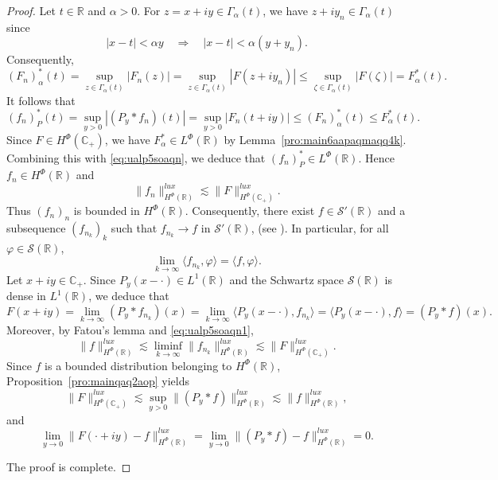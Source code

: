 \documentclass[a4paper,12pt,intlimits,oneside]{amsart}
\theoremstyle{definition}
\numberwithin{equation}{section}
\theoremstyle{definition}
\begin{document}
\begin{proof}
Let $t\in\mathbb{R}$ and $\alpha>0$. 
For $z=x+iy\in\Gamma_{\alpha}(t)$, we have $z+i y_{n}\in\Gamma_{\alpha}(t)$ since
\[
|x-t|<\alpha y
\quad\Rightarrow\quad
|x-t|<\alpha(y+y_{n}).
\]
Consequently,
\[
(F_{n})_{\alpha}^{*}(t)
=\sup_{z\in\Gamma_{\alpha}(t)}|F_{n}(z)|
=\sup_{z\in\Gamma_{\alpha}(t)}|F(z+i y_{n})|
\le 
\sup_{\zeta\in\Gamma_{\alpha}(t)}|F(\zeta)|
=F_{\alpha}^{*}(t).
\]
It follows that
\begin{equation}\label{eq:ualp5soaqn}
(f_{n})_{P}^{*}(t)
=\sup_{y>0}|(P_{y}\ast f_{n})(t)|
=\sup_{y>0}|F_{n}(t+iy)|
\le 
(F_{n})_{\alpha}^{*}(t)
\le 
F_{\alpha}^{*}(t).
\end{equation}
Since $F\in H^{\Phi}(\mathbb{C}_{+})$, we have $F_{\alpha}^{*}\in L^{\Phi}(\mathbb{R})$ by Lemma~\ref{pro:main6aapaqmaqq4k}. 
Combining this with \eqref{eq:ualp5soaqn}, we deduce that $(f_{n})_{P}^{*}\in L^{\Phi}(\mathbb{R})$. 
Hence $f_{n}\in H^{\Phi}(\mathbb{R})$ and
\begin{equation}\label{eq:ualp5soaqn1}
\|f_{n}\|_{H^{\Phi}(\mathbb{R})}^{lux}
\lesssim
\|F\|_{H^{\Phi}(\mathbb{C}_{+})}^{lux}.
\end{equation}
Thus $(f_{n})_{n}$ is bounded in $H^{\Phi}(\mathbb{R})$. 
Consequently, there exist $f\in\mathscr{S}'(\mathbb{R})$ and a subsequence $(f_{n_{k}})_{k}$ such that $f_{n_{k}}\to f$ in $\mathscr{S}'(\mathbb{R})$, (see  \cite{yangLiangKy}).  In particular, for all $\varphi\in\mathscr{S}(\mathbb{R})$,
\[
\lim_{k\to\infty}\langle f_{n_{k}},\varphi\rangle
=
\langle f,\varphi\rangle.
\]
Let $x+iy\in\mathbb{C}_{+}$. 
Since $P_{y}(x-\cdot)\in L^{1}(\mathbb{R})$ and the Schwartz space $\mathscr{S}(\mathbb{R})$ is dense in $L^{1}(\mathbb{R})$, we deduce that
\begin{equation}\label{eq:ualpn1}
F(x+iy)
=\lim_{k\to\infty}(P_{y}\ast f_{n_{k}})(x)
=\lim_{k\to\infty}\langle P_{y}(x-\cdot),f_{n_{k}}\rangle
=\langle P_{y}(x-\cdot),f\rangle
=(P_{y}\ast f)(x).
\end{equation}
Moreover, by Fatou's lemma and \eqref{eq:ualp5soaqn1},
\begin{equation}\label{eq:ualp5sn1}
\|f\|_{H^{\Phi}(\mathbb{R})}^{lux}
\lesssim
\liminf_{k\to\infty}\|f_{n_{k}}\|_{H^{\Phi}(\mathbb{R})}^{lux}
\lesssim
\|F\|_{H^{\Phi}(\mathbb{C}_{+})}^{lux}.
\end{equation}
Since $f$ is a bounded distribution belonging to $H^{\Phi}(\mathbb{R})$, Proposition~\ref{pro:mainqaq2aop} yields
\begin{equation}\label{eq:ualp5snaq1}
\|F\|_{H^{\Phi}(\mathbb{C}_{+})}^{lux}
\lesssim
\sup_{y>0}\|(P_{y}\ast f)\|_{H^{\Phi}(\mathbb{R})}^{lux}
\lesssim
\|f\|_{H^{\Phi}(\mathbb{R})}^{lux},
\end{equation}
and
\[
\lim_{y\to 0}
\|F(\cdot+iy)-f\|_{H^{\Phi}(\mathbb{R})}^{lux}
=
\lim_{y\to0}
\|(P_{y}\ast f)-f\|_{H^{\Phi}(\mathbb{R})}^{lux}
=0.
\]

The proof is complete.
\end{proof}
\end{document}
